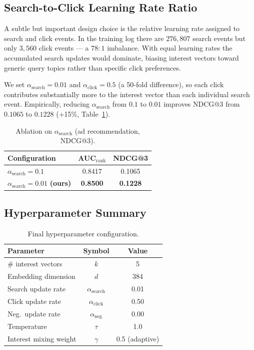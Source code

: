 \documentclass[10pt,twocolumn]{article}
\begin{document}
\subsection{Search-to-Click Learning Rate Ratio}
\label{sec:design}

A subtle but important design choice is the relative learning rate
assigned to search and click events.
In the training log there are $276{,}807$ search events but only
$3{,}560$ click events --- a $78:1$ imbalance.
With equal learning rates the accumulated search updates would dominate,
biasing interest vectors toward generic query topics rather than
specific click preferences.

We set $\alpha_{\text{search}} = 0.01$ and $\alpha_{\text{click}} = 0.5$
(a 50-fold difference), so each click contributes substantially more to
the interest vector than each individual search event.
Empirically, reducing $\alpha_{\text{search}}$ from $0.1$ to $0.01$
improves NDCG@3 from $0.1065$ to $0.1228$ (+15\%, Table~\ref{tab:ablation}).

\begin{table}[h]
\centering
\caption{Ablation on $\alpha_{\text{search}}$ (ad recommendation, NDCG@3).}
\label{tab:ablation}
\small
\begin{tabular}{lcc}
\toprule
Configuration & AUC$_{\text{rank}}$ & NDCG@3 \\
\midrule
$\alpha_{\text{search}} = 0.1$ & 0.8417 & 0.1065 \\
$\alpha_{\text{search}} = 0.01$ \textbf{(ours)} & \textbf{0.8500} & \textbf{0.1228} \\
\bottomrule
\end{tabular}
\end{table}

\subsection{Hyperparameter Summary}
\label{sec:hyper}

\begin{table}[h]
\centering
\caption{Final hyperparameter configuration.}
\label{tab:hyper}
\small
\begin{tabular}{lcc}
\toprule
Parameter & Symbol & Value \\
\midrule
\# interest vectors    & $k$                      & 5 \\
Embedding dimension    & $d$                      & 384 \\
Search update rate     & $\alpha_{\text{search}}$ & 0.01 \\
Click update rate      & $\alpha_{\text{click}}$  & 0.50 \\
Neg.\ update rate      & $\alpha_{\text{neg}}$    & 0.00 \\
Temperature            & $\tau$                   & 1.0 \\
Interest mixing weight & $\gamma$                 & 0.5 (adaptive) \\
\bottomrule
\end{tabular}
\end{table}
\end{document}
